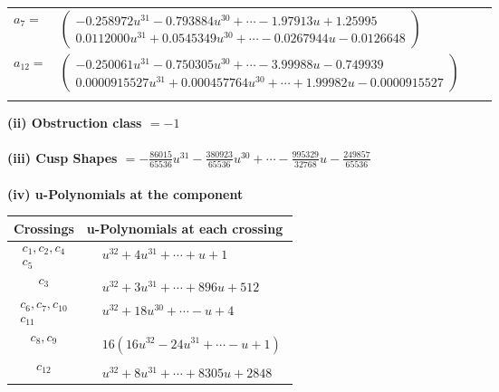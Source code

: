 \documentclass[1p]{elsarticle_modified}
\theoremstyle{definition}
\begin{document}
\begin{tabular}{m{7pt} m{180pt} m{7pt} m{180pt} }
\flushright $a_{7}=$&$\begin{pmatrix}-0.258972 u^{31}-0.793884 u^{30}+\cdots-1.97913 u+1.25995\\0.0112000 u^{31}+0.0545349 u^{30}+\cdots-0.0267944 u-0.0126648\end{pmatrix}$ \\
\flushright $a_{12}=$&$\begin{pmatrix}-0.250061 u^{31}-0.750305 u^{30}+\cdots-3.99988 u-0.749939\\0.0000915527 u^{31}+0.000457764 u^{30}+\cdots+1.99982 u-0.0000915527\end{pmatrix}$\\&\end{tabular}
\flushleft \textbf{(ii) Obstruction class $= -1$}\\~\\
\flushleft \textbf{(iii) Cusp Shapes $= -\frac{86015}{65536} u^{31}-\frac{380923}{65536} u^{30}+\cdots-\frac{995329}{32768} u-\frac{249857}{65536}$}\\~\\
\newpage\renewcommand{\arraystretch}{1}
\flushleft \textbf{(iv) u-Polynomials at the component}\newline \\
\begin{tabular}{m{50pt}|m{274pt}}
Crossings & \hspace{64pt}u-Polynomials at each crossing \\
\hline $$\begin{aligned}c_{1},c_{2},c_{4}\\c_{5}\end{aligned}$$&$\begin{aligned}
&u^{32}+4 u^{31}+\cdots+u+1
\end{aligned}$\\
\hline $$\begin{aligned}c_{3}\end{aligned}$$&$\begin{aligned}
&u^{32}+3 u^{31}+\cdots+896 u+512
\end{aligned}$\\
\hline $$\begin{aligned}c_{6},c_{7},c_{10}\\c_{11}\end{aligned}$$&$\begin{aligned}
&u^{32}+18 u^{30}+\cdots- u+4
\end{aligned}$\\
\hline $$\begin{aligned}c_{8},c_{9}\end{aligned}$$&$\begin{aligned}
&16(16 u^{32}-24 u^{31}+\cdots- u+1)
\end{aligned}$\\
\hline $$\begin{aligned}c_{12}\end{aligned}$$&$\begin{aligned}
&u^{32}+8 u^{31}+\cdots+8305 u+2848
\end{aligned}$\\
\hline
\end{tabular}\\~\\
\end{document}
